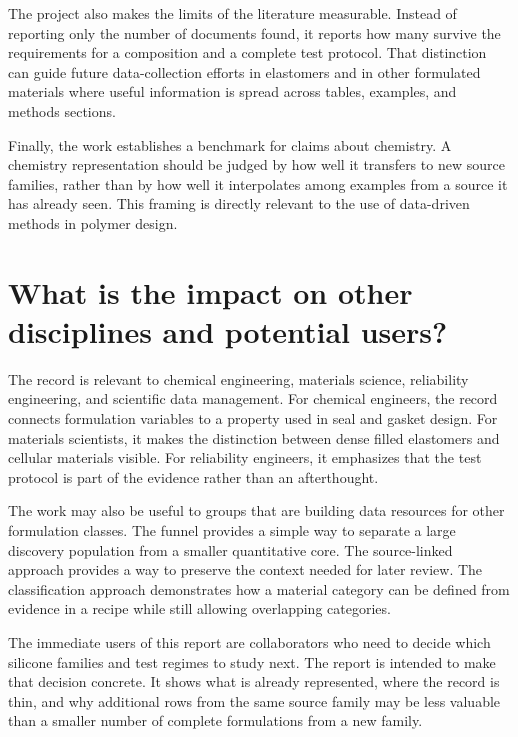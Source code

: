 \documentclass[10pt]{article}
\begin{document}
The project also makes the limits of the literature measurable. Instead of
reporting only the number of documents found, it reports how many survive the
requirements for a composition and a complete test protocol. That distinction
can guide future data-collection efforts in elastomers and in other formulated
materials where useful information is spread across tables, examples, and
methods sections.

Finally, the work establishes a benchmark for claims about chemistry. A
chemistry representation should be judged by how well it transfers to new
source families, rather than by how well it interpolates among examples from a
source it has already seen. This framing is directly relevant to the use of
data-driven methods in polymer design.

\section{What is the impact on other disciplines and potential users?}
The record is relevant to chemical engineering, materials science, reliability
engineering, and scientific data management. For chemical engineers, the
record connects formulation variables to a property used in seal and gasket
design. For materials scientists, it makes the distinction between dense
filled elastomers and cellular materials visible. For reliability engineers,
it emphasizes that the test protocol is part of the evidence rather than an
afterthought.

The work may also be useful to groups that are building data resources for
other formulation classes. The funnel provides a simple way to separate a
large discovery population from a smaller quantitative core. The source-linked
approach provides a way to preserve the context needed for later review. The
classification approach demonstrates how a material category can be defined
from evidence in a recipe while still allowing overlapping categories.

The immediate users of this report are collaborators who need to decide which
silicone families and test regimes to study next. The report is intended to
make that decision concrete. It shows what is already represented, where the
record is thin, and why additional rows from the same source family may be
less valuable than a smaller number of complete formulations from a new family.
\end{document}
